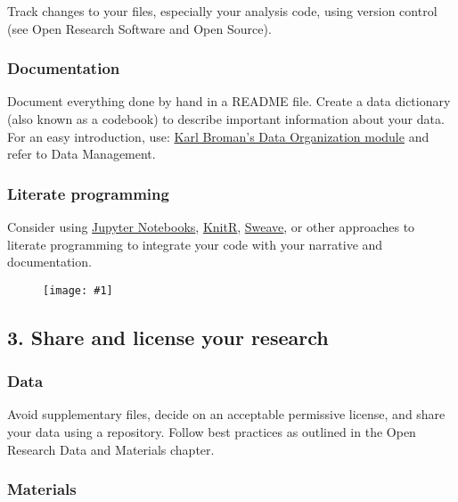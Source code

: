 \documentclass{article}
\newlength{\imgwidth}
\newcommand\scaledgraphics[2]{%
                
\settowidth{\imgwidth}{\texttt{[image: \#1]}}%
                
\setlength{\imgwidth}{\minof{\imgwidth}{#2\textwidth}}%
                
\texttt{[image: \#1]}%
                
}
\begin{document}
Track changes to your files, especially your analysis code, using version control (see Open Research Software and Open Source).


\subsubsection{Documentation}\label{documentation}



Document everything done by hand in a README file. Create a data dictionary (also known as a codebook) to describe important information about your data. For an easy introduction, use: \href{http://kbroman.org/dataorg/pages/dictionary.html}{Karl Broman’s Data Organization module} and refer to Data Management.


\subsubsection{Literate programming}\label{literate-programming}



Consider using \href{http://jupyter.org/}{Jupyter Notebooks}, \href{https://yihui.name/knitr/}{KnitR}, \href{https://support.rstudio.com/hc/en-us/articles/200552056-Using-Sweave-and-knitr}{Sweave}, or other approaches to literate programming to integrate your code with your narrative and documentation.

\begin{figure}
\scaledgraphics{bc14044b-eec3-4ed3-b0e7-e2156edefa58.png}{1}
\label{F41172011}
\end{figure}


\subsection{\textbf{3. Share and license your research}}\label{3-share-and-license-your-research}



\subsubsection{Data}\label{data}



Avoid supplementary files, decide on an acceptable permissive license, and share your data using a repository. Follow best practices as outlined in the Open Research Data and Materials chapter.


\subsubsection{Materials}\label{materials}
\end{document}
